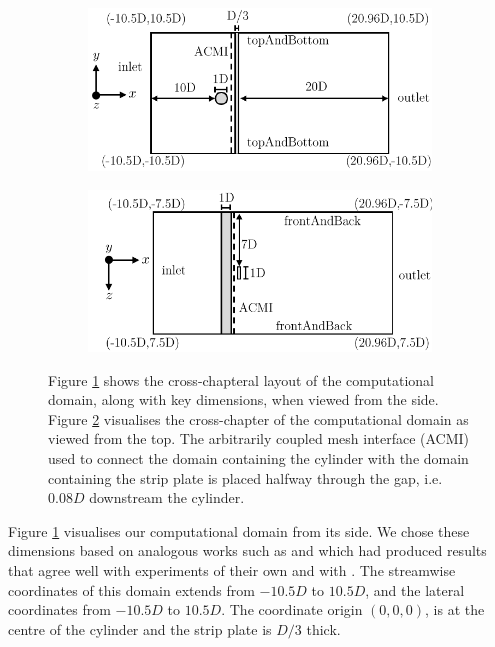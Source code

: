 \documentclass[oneside]{utmthesis}
\let\cite\citep
\begin{document}
\begin{figure}
  \centering
  \begin{subfigure}[h]{0.5\textwidth}
    \includegraphics[width=\textwidth]{figs/problemGeometrySide}
    \caption{}
    \label{fig:probGeoSide}
  \end{subfigure}

  \begin{subfigure}[h]{0.5\textwidth}
    \includegraphics[width=\textwidth]{figs/problemGeometryTop}
    \caption{}
    \label{fig:probGeoTop}
  \end{subfigure}

  \caption{Figure \ref{fig:probGeoSide} shows the cross-chapteral layout of the computational domain, along with key dimensions, when viewed from the side. Figure \ref{fig:probGeoTop} visualises the cross-chapter of the computational domain as viewed from the top. The arbitrarily coupled mesh interface (ACMI) used to connect the domain containing the cylinder with the domain containing the strip plate is placed halfway through the gap, i.e. $0.08D$ downstream the cylinder.} \label{fig:problemGeometry}
\end{figure}

Figure \ref{fig:probGeoSide} visualises our computational domain from its side. We chose these dimensions based on analogous works such as \cite{Maruai2017} and \cite{Maruai2018} which had produced results that agree well with experiments of their own and with \citet{Kawabata2013}. The streamwise coordinates of this domain extends from $-10.5D$ to $10.5D$, and the lateral coordinates from $-10.5D$ to $10.5D$. The coordinate origin $(0,0,0)$, is at the centre of the cylinder and the strip plate is $D/3$ thick.
\end{document}
